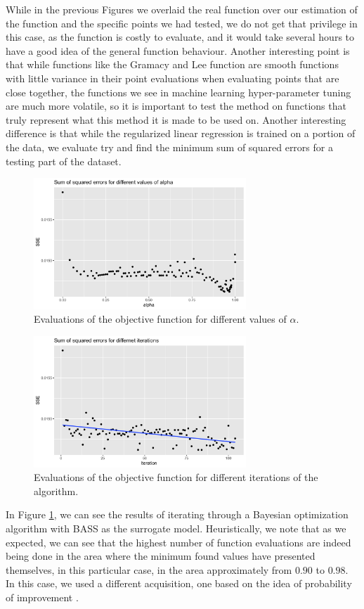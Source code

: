 \documentclass[%
 aip,
 amsmath,amssymb,
 reprint,%
]{revtex4-1}
\begin{document}
While in the previous Figures we overlaid the real function over our estimation of the function and the specific points we had tested, we do not get that privilege in this case, as the function is costly to evaluate, and it would take several hours to have a good idea of the general function behaviour. Another interesting point is that while functions like the Gramacy and Lee function are smooth functions with little variance in their point evaluations when evaluating points that are close together, the functions we see in machine learning hyper-parameter tuning are much more volatile, so it is important to test the method on functions that truly represent what this method it is made to be used on. Another interesting difference is that while the regularized linear regression is trained on a portion of the data, we evaluate try and find the minimum sum of squared errors for a testing part of the dataset. 

\begin{figure}
	\centering
	\includegraphics[width=8cm]{Figures/sse_alpha.png}
	\caption{Evaluations of the objective function for different values of $\alpha$.}
	\label{ssealpha}
\end{figure}

\begin{figure}
	\centering
	\includegraphics[width=8cm]{Figures/sse_iter.png}
	\caption{Evaluations of the objective function for different iterations of the algorithm.}
	\label{sseiter}
\end{figure}

In Figure \ref{ssealpha}, we can see the results of iterating through a Bayesian optimization algorithm with BASS as the surrogate model. Heuristically, we note that as we expected, we can see that the highest number of function evaluations are indeed being done in the area where the minimum found values have presented themselves, in this particular case, in the area approximately from $0.90$ to $0.98$.  In this case, we used a different acquisition, one based on the idea of probability of improvement \cite{snoek2012practical}. 
\end{document}

